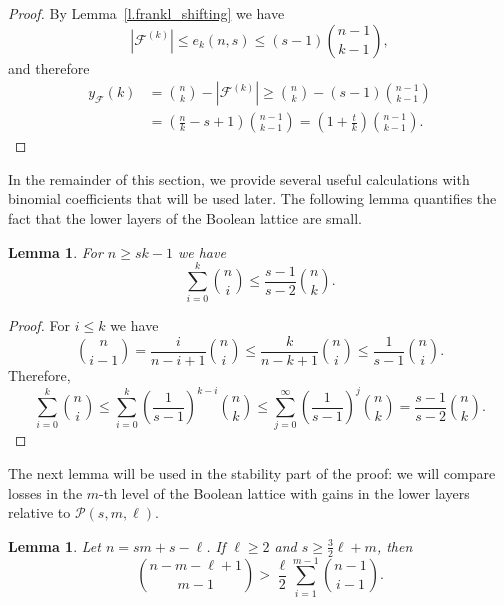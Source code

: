 \documentclass{article}
\newtheorem{lemma}[theorem]{Lemma}
\begin{document}
\begin{proof}
    By Lemma~\ref{l.frankl_shifting} we have
    \[
    |\mathcal{F}^{(k)}| \leq e_k(n, s) \leq (s-1){n-1 \choose k - 1},
    \]
    and therefore
    \begin{align*}
        y_{\mathcal{F}}(k)
        &= {n \choose k} - |\mathcal{F}^{(k)}|\geq {n \choose k} - (s-1){n-1 \choose k - 1} \\
        &= \left(\frac{n}{k}-s+1\right){n-1 \choose k - 1} = \left(1+\frac{t}{k}\right){n-1 \choose k - 1}.
    \end{align*}
\end{proof}

In the remainder of this section, we provide several useful calculations with binomial coefficients that will be used later. The following lemma quantifies the fact that the lower layers of the Boolean lattice are small.

\begin{lemma} \label{l: low layers are small}
    For $n \geq sk - 1$ we have
    \[
    \sum_{i=0}^{k}{n \choose i} \leq \frac{s-1}{s-2}{n \choose k}.
    \]
\end{lemma}

\begin{proof}
    For $i \leq k$ we have
    \[
    {n \choose i - 1} = \frac{i}{n-i+1}{n \choose i} \leq \frac{k}{n-k+1}{n \choose i} \leq \frac{1}{s-1}{n \choose i}.
    \]
    Therefore,
    \[
    \sum_{i=0}^{k}{n \choose i}
    \leq \sum_{i=0}^{k}\left(\frac{1}{s-1}\right)^{k-i}{n \choose k}
    \leq \sum_{j=0}^{\infty}\left(\frac{1}{s-1}\right)^{j}{n \choose k}
    =
    \frac{s-1}{s-2}{n \choose k}.
    \]
\end{proof}

The next lemma will be used in the stability part of the proof: we will compare losses in the $m$-th level of the Boolean lattice with gains in the lower layers relative to $\mathcal{P}(s, m, \ell)$.

\begin{lemma} \label{l: HM calculation}
    Let $n = sm + s - \ell$. If $\ell \geq 2$ and $s \geq \frac{3}{2}\ell + m$, then
    \begin{equation} \label{eq: HM calculation}
        {n - m - \ell + 1 \choose m -1} > \frac{\ell}{2}\sum_{i=1}^{m-1}{n-1 \choose i - 1}.
    \end{equation}
\end{lemma}
\end{document}
